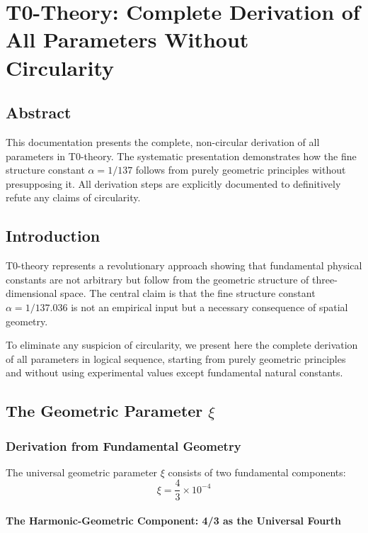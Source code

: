 \chapter{T0-Theory: Complete Derivation of All Parameters Without Circularity}

\section*{Abstract}
		This documentation presents the complete, non-circular derivation of all parameters in T0-theory. The systematic presentation demonstrates how the fine structure constant $\alpha = 1/137$ follows from purely geometric principles without presupposing it. All derivation steps are explicitly documented to definitively refute any claims of circularity.


	\section{Introduction}
	
	T0-theory represents a revolutionary approach showing that fundamental physical constants are not arbitrary but follow from the geometric structure of three-dimensional space. The central claim is that the fine structure constant $\alpha = 1/137.036$ is not an empirical input but a necessary consequence of spatial geometry.
	
	To eliminate any suspicion of circularity, we present here the complete derivation of all parameters in logical sequence, starting from purely geometric principles and without using experimental values except fundamental natural constants.
	
\section{The Geometric Parameter $\xi$}

\subsection{Derivation from Fundamental Geometry}

The universal geometric parameter $\xi$ consists of two fundamental components:
\begin{equation}
	\xi = \frac{4}{3} \times 10^{-4}
\end{equation}

\subsubsection{The Harmonic-Geometric Component: 4/3 as the Universal Fourth}

